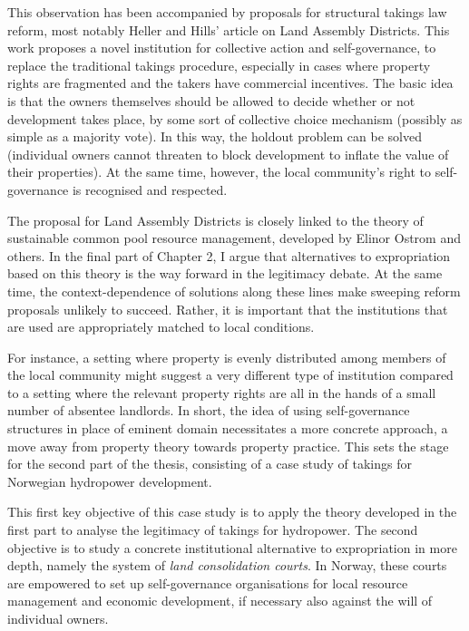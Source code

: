 This observation has been accompanied by proposals for structural takings law reform, most notably Heller and Hills' article on Land Assembly Districts. This work proposes a novel institution for collective action and self-governance, to replace the traditional takings procedure, especially in cases where property rights are fragmented and the takers have commercial incentives. The basic idea is that the owners themselves should be allowed to decide whether or not development takes place, by some sort of collective choice mechanism (possibly as simple as a majority vote). In this way, the holdout problem can be solved (individual owners cannot threaten to block development to inflate the value of their properties). At the same time, however, the local community's right to self-governance is recognised and respected.
 
The proposal for Land Assembly Districts is closely linked to the theory of sustainable common pool resource management, developed by Elinor Ostrom and others. In the final part of Chapter 2, I argue that alternatives to expropriation based on this theory is the way forward in the legitimacy debate. At the same time, the context-dependence of solutions along these lines make sweeping reform proposals unlikely to succeed. Rather, it is important that the institutions that are used are appropriately matched to local conditions. 

For instance, a setting where property is evenly distributed among members of the local community might suggest a very different type of institution compared to a setting where the relevant property rights are all in the hands of a small number of absentee landlords. In short, the idea of using self-governance structures in place of eminent domain necessitates a more concrete approach, a move away from property theory towards property practice. This sets the stage for the second part of the thesis, consisting of a case study of takings for Norwegian hydropower development. 

This first key objective of this case study is to apply the theory developed in the first part to analyse the legitimacy of takings for hydropower. The second objective is to study a concrete institutional alternative to expropriation in more depth, namely the system of {\it land consolidation courts}. In Norway, these courts are empowered to set up self-governance organisations for local resource management and economic development, if necessary also against the will of individual owners.

